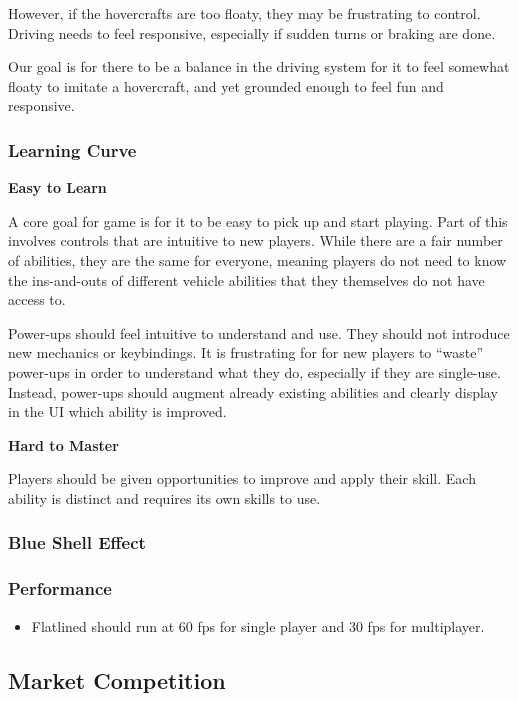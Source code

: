 \documentclass{article}
\newcommand{\name}{Flatlined}
\theoremstyle{definition}
\begin{document}
However, if the hovercrafts are too floaty, they may be frustrating to control.
Driving needs to feel responsive, especially if sudden turns or braking are
done.

Our goal is for there to be a balance in the driving system for it to feel
somewhat floaty to imitate a hovercraft, and yet grounded enough to feel fun
and responsive.

\subsubsection{Learning Curve}

\textbf{Easy to Learn}

A core goal for game is for it to be easy to pick up and start playing.
Part of this involves controls that are intuitive to new players. While there
are a fair number of abilities, they are the same for everyone, meaning players
do not need to know the ins-and-outs of different vehicle abilities that they
themselves do not have access to.

Power-ups should feel intuitive to understand and use. They should not
introduce new mechanics or keybindings. It is frustrating for for new players
to ``waste'' power-ups in order to understand what they do, especially if they
are single-use. Instead, power-ups should augment already existing abilities
and clearly display in the UI which ability is improved.

\textbf{Hard to Master}

Players should be given opportunities to improve and apply their skill. Each
ability is distinct and requires its own skills to use.

\subsubsection{Blue Shell Effect} %


\subsubsection{Performance}

\begin{itemize}
  \item \name{} should run at 60 fps for single player and 30 fps for
    multiplayer.
\end{itemize}


\subsection{Market Competition}
\end{document}
